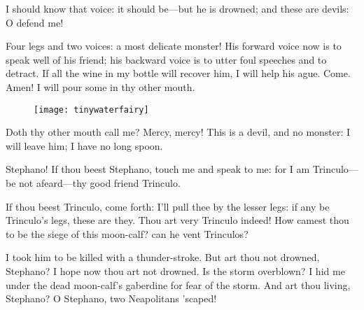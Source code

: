 \begin{prose_speech}[Trinculo] 
I should know that voice: it should be—but he is drowned; and these are devils: O defend me!
\end{prose_speech}

\begin{prose_speech}[Stephano] 
Four legs and two voices: a most delicate monster! His forward voice now is to speak well of his friend; his backward voice is to utter foul speeches and to detract. If all the wine in my bottle will recover him, I will help his ague. Come. Amen! I will pour some in thy other mouth.
\end{prose_speech}

	\begin{figure}[tb]
		\centering
		\texttt{[image: tinywaterfairy]}
	\end{figure}
	
	
\begin{prose_speech}[Stephano] 
Doth thy other mouth call me? Mercy, mercy! This is a devil, and no monster: I will leave him; I have no long spoon.
\end{prose_speech}

\begin{prose_speech}[Trinculo] 
Stephano! If thou beest Stephano, touch me and speak to me: for I am Trinculo—be not afeard—thy good friend Trinculo.
\end{prose_speech}

\begin{prose_speech}[Stephano] 
If thou beest Trinculo, come forth: I'll pull thee by the lesser legs: if any be Trinculo's legs, these are they. Thou art very Trinculo indeed! How camest thou to be the siege of this moon-calf? can he vent Trinculos?
\end{prose_speech}


\begin{prose_speech}[Trinculo] 
I took him to be killed with a thunder-stroke. But art thou not drowned, Stephano? I hope now thou art not drowned. Is the storm overblown? I hid me under the dead moon-calf's gaberdine for fear of the storm. And art thou living, Stephano? O Stephano, two Neapolitans 'scaped!
\end{prose_speech}


\begin{prose_speech}[Caliban] 
\end{prose_speech}


